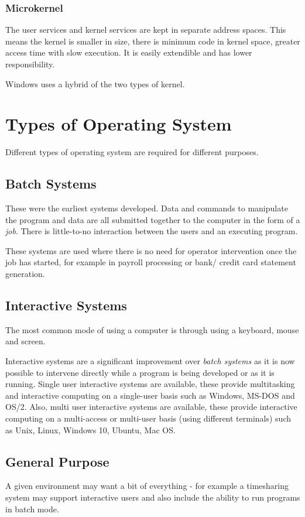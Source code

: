 \subsubsection*{Microkernel}
The user services and kernel services are kept in separate address spaces. This means the kernel is smaller in size, there is minimum code in kernel space, greater access time with slow execution. It is easily extendible and has lower responsibility.

Windows uses a hybrid of the two types of kernel.

\section*{Types of Operating System}
Different types of operating system are required for different purposes.
\subsection*{Batch Systems}
These were the earliest systems developed. Data and commands to manipulate the program and data are all submitted together to the computer in the form of a \textit{job}. There is little-to-no interaction between the users and an executing program.

These systems are used where there is no need for operator intervention once the job has started, for example in payroll processing or bank/ credit card statement generation. 

\subsection*{Interactive Systems}
The most common mode of using a computer is through using a keyboard, mouse and screen.

Interactive systems are a significant improvement over \textit{batch systems} as it is now possible to intervene directly while a program is being developed or as it is running. Single user interactive systems are available, these provide multitasking and interactive computing on a single-user basis such as Windows, MS-DOS and OS/2. Also, multi user interactive systems are available, these provide interactive computing on a multi-access or multi-user basis (using different terminals) such as Unix, Linux, Windows 10, Ubuntu, Mac OS. 

\subsection*{General Purpose}
A given environment may want a bit of everything - for example a timesharing system may support interactive users and also include the ability to run programs in batch mode.

